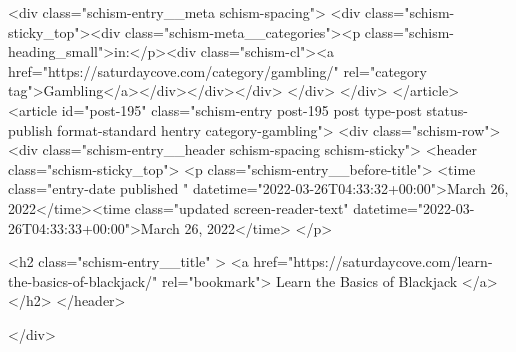 {		<div class="schism-entry__meta schism-spacing">			<div class="schism-sticky_top"><div class="schism-meta__categories"><p class="schism-heading_small">in:</p><div class="schism-cl"><a href="https://saturdaycove.com/category/gambling/" rel="category tag">Gambling</a></div></div></div>		</div>
	</div>
</article>
<article id="post-195" class="schism-entry post-195 post type-post status-publish format-standard hentry category-gambling">
	<div class="schism-row">		<div class="schism-entry__header schism-spacing schism-sticky">			<header class="schism-sticky_top">				<p class="schism-entry__before-title">
					<time class="entry-date published " datetime="2022-03-26T04:33:32+00:00">March 26, 2022</time><time class="updated screen-reader-text" datetime="2022-03-26T04:33:33+00:00">March 26, 2022</time>				</p>

				<h2 class="schism-entry__title" >
					<a href="https://saturdaycove.com/learn-the-basics-of-blackjack/" rel="bookmark">
						Learn the Basics of Blackjack					</a>
				</h2>
			</header>

					</div>

}
